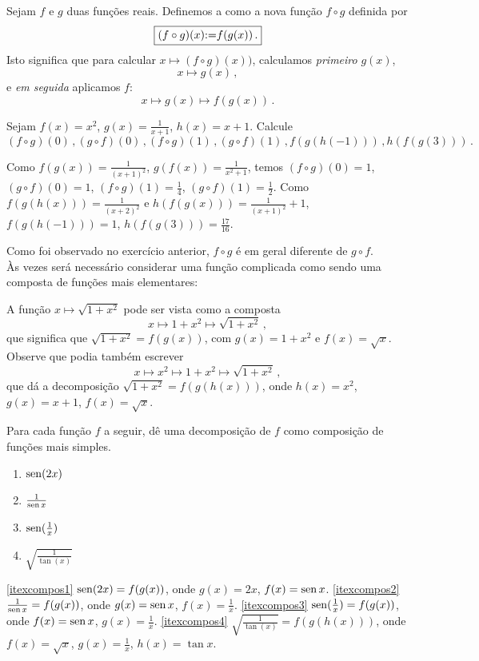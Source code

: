 Sejam $f$ e $g$ duas funções reais. Definemos a  como a nova função $f\circ g$ definida por
$$\boxed{(f\circ g)(x){:=} f(g(x))\,.}$$
Isto significa que para calcular $x\mapsto (f\circ g)(x))$, 
calculamos \emph{primeiro} $g(x)$,
$$x\mapsto g(x)\,,$$
e \emph{em seguida} aplicamos $f$:
$$x\mapsto g(x)\mapsto f(g(x))\,.$$

\begin{exo}
Sejam $f(x)=x^2$, $g(x)=\frac{1}{x+1}$, $h(x)=x+1$. Calcule 
$$(f\circ g)(0)\,, (g\circ f)(0)\,, (f\circ g)(1)\,, (g\circ f)(1)\,, f(g(h(-1)))\,,
h(f(g(3)))\,.$$
\begin{sol} Como $f(g(x))=\frac{1}{(x+1)^2}$, $g(f(x))=\frac{1}{x^2+1}$, temos
$(f\circ g)(0)=1$, $(g\circ f)(0)=1$, $(f\circ g)(1)=\frac14$, $(g\circ f)(1)=\frac12$.
Como $f(g(h(x)))=\frac{1}{(x+2)^2}$ e $h(f(g(x)))=\frac{1}{(x+1)^2}+1$, 
 $f(g(h(-1)))=1$,
$h(f(g(3)))=\frac{17}{16}$.
\end{sol}
\end{exo}

Como foi observado no exercício anterior, $f\circ g$ é em geral diferente de $g\circ f$.\\

Às vezes será necessário considerar uma função complicada como sendo uma composta de
funções mais elementares:
\begin{ex}
A função $x\mapsto \sqrt{1+x^2}$ pode ser vista como a composta
$$x\mapsto 1+x^2\mapsto\sqrt{1+x^2}\,,$$
que significa que $\sqrt{1+x^2}=f(g(x))$, com $g(x)=1+x^2$ e $f(x)=\sqrt{x}$.
Observe que podia também escrever 
$$x\mapsto x^2\mapsto 1+x^2\mapsto \sqrt{1+x^2}\,,$$
que dá a decomposição $\sqrt{1+x^2}=f(g(h(x)))$, onde $h(x)=x^2$, $g(x)=x+1$,
$f(x)=\sqrt{x}$.
\end{ex}

\begin{exo}\label{Exo_elem_decomp_compos}
Para cada função $f$ a seguir, dê uma decomposição de $f$ como composição de funções mais
simples. 
\begin{multicols}{3}
\begin{enumerate}
\item\label{itexcompos1} $\operatorname{sen} (2x)$
\item\label{itexcompos2} $\frac{1}{\operatorname{sen} x}$
\item\label{itexcompos3} $\operatorname{sen} (\tfrac1x)$
\item\label{itexcompos4} $\sqrt{\frac{1}{\tan (x)}}$
\end{enumerate}
\end{multicols}
\vspace{0.01cm}
\begin{sol}
\eqref{itexcompos1} $\operatorname{sen} (2x)=f(g(x))$, onde $g(x)=2x$, $f(x)=\operatorname{sen} x$.
\eqref{itexcompos2} $\frac{1}{\operatorname{sen} x}=f(g(x))$, onde $g(x)=\operatorname{sen} x$, $f(x)=\frac1x$.
\eqref{itexcompos3} $\operatorname{sen}(\frac{1}{x})=f(g(x))$, onde $f(x)=\operatorname{sen} x$, $g(x)=\frac1x$.
\eqref{itexcompos4} $\sqrt{\frac{1}{\tan (x)}}=f(g(h(x)))$, onde $f(x)=\sqrt{x}$,
$g(x)=\frac{1}{x}$, $h(x)=\tan x$.
\end{sol}

\end{exo}

